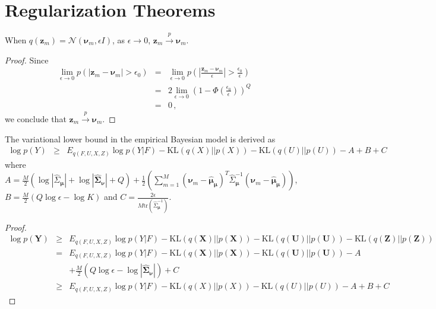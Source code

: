 \appendix

\section{Regularization Theorems} 
\label{sec: rt}
\begin{lemma}
	When $q(\bm z_m) = \mathcal{N}(\bm \nu_m, \epsilon I)$, as $\epsilon \rightarrow 0$, $\bm z_m \stackrel{p}{\rightarrow} \bm \nu_m$.
\end{lemma}

\begin{proof} Since
	\begin{eqnarray}
	\lim\limits_{\epsilon \rightarrow 0} p(|\bm z_m - \bm \nu_m| > \epsilon_0) & = & \lim\limits_{\epsilon \rightarrow 0} p(|\frac{\bm z_m - \bm \nu_m}{\epsilon}| > \frac{\epsilon_0}{\epsilon}) \nonumber \\
	& = & 2\lim\limits_{\epsilon \rightarrow 0} (1 - \Phi(\frac{\epsilon_0}{\epsilon}))^{Q} \nonumber \\
	& = & 0 \,, \nonumber
	\end{eqnarray}
	we conclude that $\bm z_m \stackrel{p}{\rightarrow} \bm \nu_m$.
\end{proof}

\begin{lemma}
	The variational lower bound in the empirical Bayesian model is derived as 
	\begin{eqnarray}
	\log p(Y) & \geq & E_{q(F, U, X, Z)}\log p(Y|F) - \mathrm{KL}(q(X)||p(X)) - \mathrm{KL}(q(U)||p(U)) - A + B + C \nonumber
	\end{eqnarray}
	where $A = \frac{M}{2}(\log |\hat{\Sigma}_{\bm \mu}| + \log|\hat{\bm\Sigma}_{\bm\nu}| + Q) + \frac{1}{2}\left(\sum_{m = 1}^M(\bm\nu_m - \hat{\bm \mu}_{\bm \mu})^T\hat{\Sigma}_{\bm\mu}^{-1}(\bm\nu_m - \hat{\bm \mu}_{\bm \mu})\right)$, $B = \frac{M}{2}(Q\log\epsilon-\log K)$ and $C = \frac{2\epsilon}{M\mathrm{tr}(\hat{\Sigma}_{\bm\mu}^{-1})}$.
\end{lemma}

\begin{proof}
	{\footnotesize
		\begin{eqnarray}
		\log p(\bm Y) & \geq &  E_{q(F, U, X, Z)}\log p(Y|F) - \mathrm{KL}(q(\bm X)|| p(\bm X)) - \mathrm{KL}(q(\bm U) ||p(\bm U )) -\mathrm{KL}(q(\bm Z)|| p(\bm Z)) \nonumber \\
		& = & E_{q(F, U, X, Z)}\log p(Y|F) - \mathrm{KL}(q(\bm X)|| p(\bm X)) - \mathrm{KL}(q(\bm U) ||p(\bm U )) - A \nonumber \\
		& & + \frac{M}{2}(Q\log\epsilon-\log |\hat{\bm\Sigma}_{\bm \nu}|) + C \nonumber \\
		& \geq & E_{q(F, U, X, Z)}\log p(Y|F) - \mathrm{KL}(q(X)||p(X)) - \mathrm{KL}(q(U)||p(U)) - A + B + C \nonumber
		\end{eqnarray}
	}
\end{proof}

